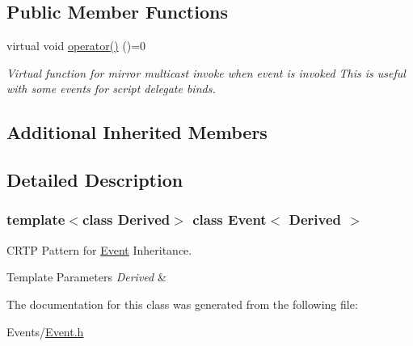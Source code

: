 \subsection*{Public Member Functions}
\begin{DoxyCompactItemize}
\item 
\mbox{\label{classEvent_af867ea2e930764ff9cb50db02bca3f83}} 
virtual void \hyperlink{classEvent_af867ea2e930764ff9cb50db02bca3f83}{operator()} ()=0
\begin{DoxyCompactList}\small\item\em Virtual function for mirror multicast invoke when event is invoked This is useful with some events for script delegate binds. \end{DoxyCompactList}\end{DoxyCompactItemize}
\subsection*{Additional Inherited Members}


\subsection{Detailed Description}
\subsubsection*{template$<$class Derived$>$\newline
class Event$<$ Derived $>$}

C\+R\+TP Pattern for \hyperlink{classEvent}{Event} Inheritance. 


\begin{DoxyTemplParams}{Template Parameters}
{\em Derived} & \\
\hline
\end{DoxyTemplParams}


The documentation for this class was generated from the following file\+:\begin{DoxyCompactItemize}
\item 
Events/\hyperlink{Event_8h}{Event.\+h}\end{DoxyCompactItemize}
